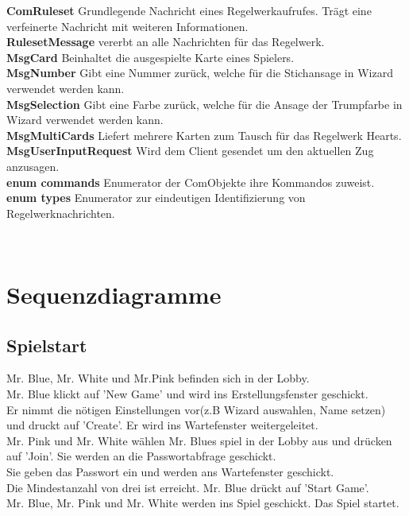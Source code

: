 \documentclass{article}
\begin{document}
		\textbf{ComRuleset} Grundlegende Nachricht eines Regelwerkaufrufes. Trägt eine verfeinerte Nachricht mit weiteren Informationen.\\
		\textbf{RulesetMessage} vererbt an alle Nachrichten für das Regelwerk.\\
		\textbf{MsgCard} Beinhaltet die ausgespielte Karte eines Spielers.\\
		\textbf{MsgNumber} Gibt eine Nummer zurück, welche für die Stichansage in Wizard verwendet werden kann.\\
		\textbf{MsgSelection} Gibt eine Farbe zurück, welche für die Ansage der Trumpfarbe in Wizard verwendet werden kann.\\
		\textbf{MsgMultiCards} Liefert mehrere Karten zum Tausch für das Regelwerk Hearts. \\
		\textbf{MsgUserInputRequest} Wird dem Client gesendet um den aktuellen Zug anzusagen.\\
		\textbf{enum commands}  Enumerator der ComObjekte ihre Kommandos zuweist. \\
		\textbf{enum types} Enumerator zur eindeutigen Identifizierung von Regelwerknachrichten.

\ \\

\section{Sequenzdiagramme}
	\subsection{Spielstart}
		Mr. Blue, Mr. White und Mr.Pink befinden sich in der Lobby. \\
		Mr. Blue klickt auf 'New Game' und wird ins Erstellungsfenster geschickt. \\
		Er nimmt die nötigen Einstellungen vor(z.B Wizard auswahlen, Name setzen) und druckt auf 'Create'. Er wird ins  Wartefenster weitergeleitet.\\
		Mr. Pink und Mr. White wählen Mr. Blues spiel in der Lobby aus und drücken auf 'Join'. Sie werden an die Passwortabfrage geschickt.\\
		Sie geben das Passwort ein und werden ans Wartefenster geschickt.\\
		Die Mindestanzahl von drei ist erreicht. Mr. Blue drückt auf 'Start Game'.\\
		Mr. Blue, Mr. Pink und Mr. White werden ins Spiel geschickt. Das Spiel startet.\\
\end{document}

